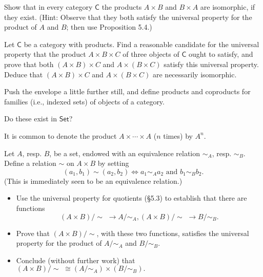 \begin{problem}
  \def \C {\mathsf{C}}
  Show that in every category $\C$ the products $A\times B$ and $B\times A$ are
  isomorphic, if they exist. (Hint: Observe that they both satisfy the universal
  property for the product of $A$ and $B$; then use Proposition 5.4.)
\end{problem}

\begin{problem}
  \def \C {\mathsf{C}}
  Let $\C$ be a category with products. Find a reasonable candidate for the
  universal property that the product $A\times B\times C$ of three objects of $\C$
  ought to satisfy, and prove that both $(A\times B)\times C$ and $A\times
  (B\times C)$ satisfy this universal property. Deduce that $(A\times B)\times C$
  and $A\times (B\times C)$ are necessarily isomorphic.
\end{problem}

\begin{problem}
  \def \Set {\mathsf{Set}}
  Push the envelope a little further still, and define products and coproducts
  for families (i.e., indexed sets) of objects of a category.

  Do these exist in $\Set$?

  It is common to denote the product $A\times\cdots\times A$ ($n$ times) by $A^n$.
\end{problem}

\begin{problem}
  \newcommand{\quot}[2]{#1/\!\!#2\,\,}
  \newcommand{\quotntws}[2]{#1/\!\!#2}
  Let $A$, resp. $B$, be a set, endowed with an equivalence relation $\sim_A$,
  resp. $\sim_B$.
  Define a relation $\sim$ on $A\times B$ by setting
  \[ (a_1, b_1) \sim (a_2, b_2) \iff a_1 \sim_A a_2 \text{ and } b_1 \sim_B b_2. \]
  (This is immediately seen to be an equivalence relation.)
  \begin{itemize}
  \item Use the universal property for quotients (\S5.3) to establish that there are
  functions
  \[ \quot{(A\times B)}{\sim} \to \quotntws{A}{\sim_A},
     \quot{(A\times B)}{\sim} \to \quotntws{B}{\sim_B}. \]
  \item Prove that $\quotntws{(A\times B)}{\sim}$, with these two functions,
  satisfies the universal property for the product of $\quotntws{A}{\sim_A}$ and
  $\quotntws{B}{\sim_B}$.
  \item Conclude (without further work) that $\quot{(A\times
  B)}{\sim}\cong(\quotntws{A}{\sim_A})\times(\quotntws{B}{\sim_B}).$
  \end{itemize}
\end{problem}

